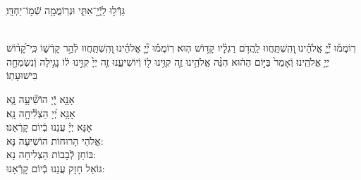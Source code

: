 \documentclass[twoside, openany, parskip=half, 11pt]{book}
\begin{document}
\shatz
ֽגַּדְּֿל֣וּ לַֽיְֿיָ֣־אִתִּ֑י וּנְרֽוֹמֲמָ֖ה שְֿׁמ֣וֹ־יַחְדָּֽו׃

\\
רֽוֹמֲמ֡וּ יְֿ֘יָ֤ אֱלֹהֵ֗ינוּ ֖וְהִֽשְׁתַּֽחֲווּ לַֽהֲדֹ֥ם רַגְלָ֗יו קָד֥וֹשׁ הֽוּא׃
רֽוֹמֲמ֡וּ יְ֘יָ֤ אֱלֹהֵ֗ינוּ ֖וְהִֽשְׁתַּֽחֲווּ לְֿהַ֣ר קָדְֿשׁ֑וֹ כִּֽי־קָ֝ד֗וֹשׁ יְיָ֥ אֱלֹהֵֽינוּ׃
וְֿאָמַר֙ בַּיּ֣וֹם הַה֔וּא הִנֵּ֨ה אֱלֹהֵ֥ינוּ זֶ֛ה קִוִּ֥ינוּ ל֖וֹ וְֿיוֹשִׁיעֵ֑נוּ זֶ֤ה יְיָ֙ קִוִּ֣ינוּ ל֔וֹ נָגִ֥ילָה וְֿנִשְׂמְחָ֖ה בִּישׁוּעָתֽוֹ׃



אָנָּ֣א יְֿ֭יָ הוֹשִׁ֘יעָ֥ה נָּ֑א\\
אָנָּ֥א יְ֝יָ הַצְלִ֘יחָ֥ה נָּֽא׃\\
אָנָּא יְיָ֗ עֲנֵנוּ בְֿיוֹם קָרְֿאֵנוּ׃\\

אֱלֹהֵי הָרוּחוֹת הוֹשִׁיעָה נָּא:\\ בּוֹחֵן לְֿבָבוֹת הַצְלִיחָה נָא:\\ גּוֹאֵל חָזָק עֲנֵנוּ בְֿיוֹם קָרְֿאֵנוּ:


\end{document}
